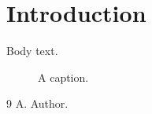 \documentclass[11pt]{stdderiv}
\begin{document}
\section{Introduction}
Body text.
\begin{figure}[h]
\caption{A caption.}
\end{figure}
\begin{thebibliography}{9}
 A. Author.
\end{thebibliography}
\end{document}
